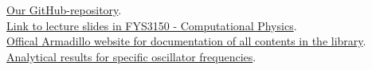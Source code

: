 \documentclass{article}
\begin{document}
\href{https://github.com/Erikbgram/Fys3150}{Our GitHub-repository}. \\

\href{https://github.com/CompPhysics/ComputationalPhysics/blob/master/doc/Lectures/lectures2015.pdf}{Link to lecture slides in FYS3150 - Computational Physics}. \\

\href{http://arma.sourceforge.net/docs.html#eig_sym}{Offical Armadillo website for documentation of all contents in the library}. \\

\href{https://journals.aps.org/pra/pdf/10.1103/PhysRevA.48.3561}{Analytical results for specific oscillator frequencies}. \\








\end{document}
